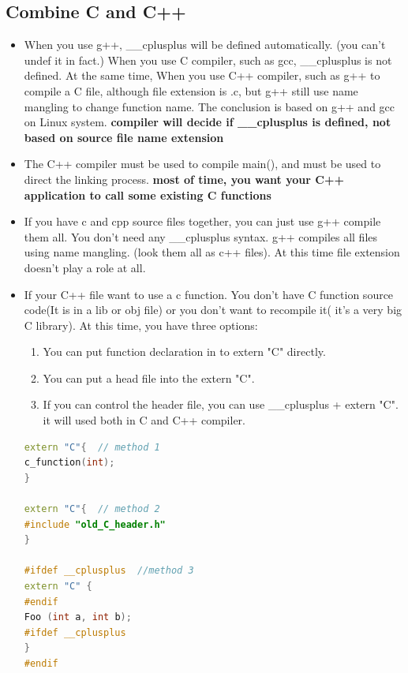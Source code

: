 \documentclass[a4paper,12pt,twoside]{book}
\begin{document}
\subsection{Combine C and C++}
\begin{itemize}
	
	\item When you use g++,  \_\_cplusplus will be defined automatically. (you can't undef it in fact.) When you use C compiler, such as gcc, \_\_cplusplus is not defined. At the same time, When you use C++ compiler, such as g++ to compile a C file, although file extension is .c, but g++ still use name mangling to change function name.  The conclusion is based on g++ and gcc on Linux system. \textbf{compiler will decide if \_\_cplusplus is defined, not based on source file name extension}
	
    \item The C++ compiler must be used to compile main(), and must be used to direct the linking process. \textbf{most of time, you want your C++ application to call some existing C functions}
    
    \item If you have c and cpp source files together, you can just use g++ compile them all. You don't need any \_\_cplusplus syntax.  g++ compiles all files using name mangling. (look them all as c++ files). At this time file extension doesn't play a role at all.
    
    \item If your C++ file want to use a c function. You don't have C function source code(It is in a lib or obj file) or you don't want to recompile it( it's a very big C library). At this time, you have three options:
    
    \begin{enumerate}
    	\item You can put function declaration in to extern "C" directly.
    	\item You can put a head file into the extern "C".
    	\item If you can control the header file, you can use \_\_cplusplus + extern "C". it will used both in C and C++ compiler.
    \end{enumerate}
\begin{lstlisting}[frame=single, language=c++]
extern "C"{  // method 1
c_function(int);
}

extern "C"{  // method 2
#include "old_C_header.h"
}

#ifdef __cplusplus  //method 3
extern "C" {
#endif
Foo (int a, int b);
#ifdef __cplusplus
}
#endif
\end{lstlisting}


\end{itemize}
\end{document}
